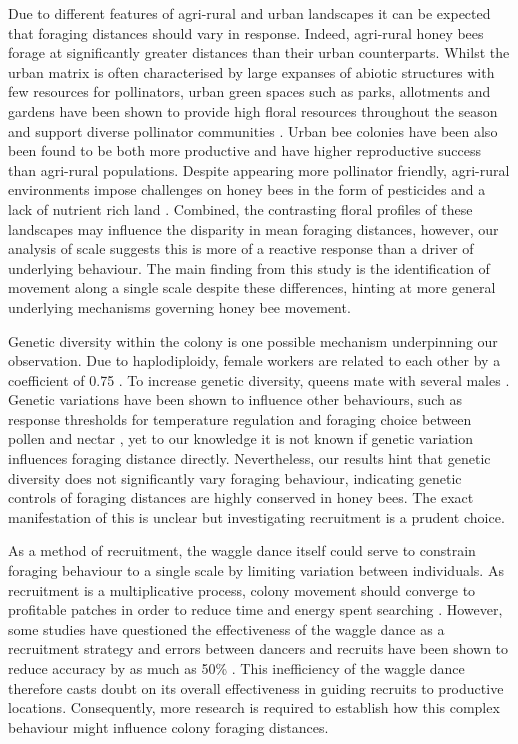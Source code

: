 \documentclass[11pt,usenames,dvipsnames,a4paper]{article}
\begin{document}
\begin{linenumbers}
Due to different features of agri-rural and urban landscapes it can be expected that foraging distances should vary in response. Indeed, agri-rural honey bees forage at significantly greater distances than their urban counterparts. Whilst the urban matrix is often characterised by large expanses of abiotic structures with few resources for pollinators, urban green spaces such as parks, allotments and gardens have been shown to provide high floral resources throughout the season \citep{Baldock2015, Baldock2019, Plascencia2017} and support diverse pollinator communities \citep{Hall2017}. Urban bee colonies have been also been found to be both more productive \citep{Lecocq2015} and have higher reproductive success \citep{Samuelson2018} than agri-rural populations. Despite appearing more pollinator friendly, agri-rural environments impose challenges on honey bees in the form of pesticides \citep{Wood2017} and a lack of nutrient rich land \citep{Carvell2006}. Combined, the contrasting floral profiles of these landscapes may influence the disparity in mean foraging distances, however, our analysis of scale suggests this is more of a reactive response than a driver of underlying behaviour. The main finding from this study is the identification of movement along a single scale despite these differences, hinting at more general underlying mechanisms governing honey bee movement.

Genetic diversity within the colony is one possible mechanism underpinning our observation. Due to haplodiploidy, female workers are related to each other by a coefficient of 0.75 \citep{Ratnieks1989}. To increase genetic diversity, queens mate with several males \citep{Jones2004}. Genetic variations have been shown to influence other behaviours, such as response thresholds for temperature regulation \citep{Jones2004} and foraging choice between pollen and nectar \citep{Fewell1993, Fewell2000}, yet to our knowledge it is not known if genetic variation influences foraging distance directly. Nevertheless, our results hint that genetic diversity does not significantly vary foraging behaviour, indicating genetic controls of foraging distances are highly conserved in honey bees. The exact manifestation of this is unclear but investigating recruitment is a prudent choice.

As a method of recruitment, the waggle dance itself could serve to constrain foraging behaviour to a single scale by limiting variation between individuals. As recruitment is a multiplicative process, colony movement should converge to profitable patches in order to reduce time and energy spent searching \citep{Seeley1995}. However, some studies have questioned the effectiveness of the waggle dance as a recruitment strategy \citep{Sherman2002, Dornhaus2004, Gruter2008, Gruter2009, Schurch2013} and errors between dancers and recruits have been shown to reduce accuracy by as much as 50\% \citep{Schurch2013}. This inefficiency of the waggle dance therefore casts doubt on its overall effectiveness in guiding recruits to productive locations. Consequently, more research is required to establish how this complex behaviour might influence colony foraging distances.


\end{linenumbers}
\end{document}
